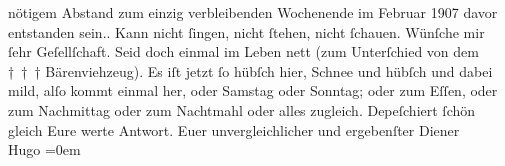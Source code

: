 \begin{ledgroupsized}[t]{13cm}
{{{                  nötigem Abstand zum einzig verbleibenden Wochenende im Februar 1907
                  davor entstanden sein.}}}\label{K_L01655-1h}. Kann nicht ſingen, nicht ſtehen, nicht ſchauen.
               Wünſche mir ſehr Geſellſchaft. Seid doch einmal im Leben nett (zum Unterſchied von
               dem † † † Bärenviehzeug). Es iſt jetzt ſo hübſch hier, Schnee und hübſch und dabei
               mild, alſo {\pb}kommt einmal her, oder Samstag oder Sonntag; oder zum Eſſen,
               oder zum Nachmittag oder zum Nachtmahl oder alles zugleich.\pend
           \pstart
           Depeſchiert ſchön gleich Eure werte Antwort.\pend
           \pstart
           Euer unvergleichlicher und ergebenſter Diener{\\[\baselineskip]}\spacefill\mbox{Hugo}\pend
           \leftskip=0em{}
         
         \endnumbering{}\end{ledgroupsized}  \newcommand{\dateiname}{L01655}\newcommand{\titel}{Hugo von Hofmannsthal an Arthur Schnitzler, [zwischen 3. – 7. 2. 1907]}\newcommand{\editorInnen}{Martin Anton Müller und Gerd-Hermann Susen}
      